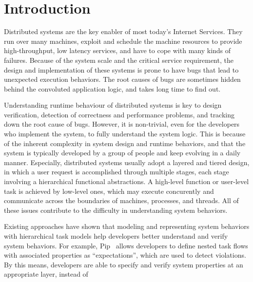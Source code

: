 
\section{Introduction}
\label{sec:intro}



Distributed systems are the key enabler of most
today's Internet Services. They run over many machines,
exploit and schedule the machine resources to provide 
high-throughput, low latency services, and have to cope 
with many kinds of failures. Because of the system scale
and the critical service requirement, the design and 
implementation of these systems is prone to have bugs
that lead to unexpected execution behaviors. 
The root causes of bugs are sometimes hidden behind
the convoluted application logic, and takes long time
to find out. 

Understanding runtime behaviour of distributed systems 
is key to design verification, detection of correctness
and performance problems, and tracking down the root cause
of bugs. However, it is non-trivial, even for the developers
who implement the system, to fully understand the system 
logic. This is because of the inherent complexity 
in system design and runtime behaviors, and that 
the system is typically developed by a group of people
and keep evolving in a daily manner.
Especially, distributed systems usually adopt a layered
and tiered design, in which a user request is accomplished
through multiple stages, each stage involving a hierarchical
functional abstractions. A high-level function or user-level
task is achieved by low-level ones, which may execute
concurently and communicate across the boundaries of machines, 
processes, and threads. All of these issues contribute to the
difficulty in understanding system behaviors.

Existing approaches have shown that modeling and representing
system behaviors with hierarchical task models help developers
better understand and verify system behaviors. For example,
Pip~\cite{} allows developers to define nested task flows
with associated properties as ``expectations'', which are used 
to detect violations.
By this means, developers are able to specify and verify 
system properties at an appropriate layer, instead of


